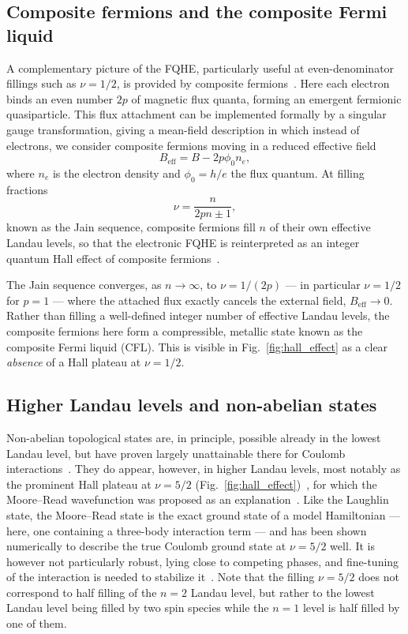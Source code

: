 \subsection{Composite fermions and the composite Fermi liquid}
A complementary picture of the FQHE, particularly useful at even-denominator fillings such as $\nu = 1/2$, is provided by composite fermions~\cite{jain1989composite}. Here each electron binds an even number $2p$ of magnetic flux quanta, forming an emergent fermionic quasiparticle. This flux attachment can be implemented formally by a singular gauge transformation, giving a mean-field description in which instead of electrons, we consider composite fermions moving in a reduced effective field
\begin{equation}
    B_{\mathrm{eff}} = B - 2p\phi_0 n_e,
\end{equation}
where $n_e$ is the electron density and $\phi_0 = h/e$ the flux quantum. At filling fractions
\begin{equation}
\nu = \frac{n}{2pn \pm 1},
\label{eq:jain_sequence}
\end{equation}
known as the Jain sequence, composite fermions fill $n$ of their own effective Landau levels, so that the electronic FQHE is reinterpreted as an integer quantum Hall effect of composite fermions~\cite{jain1989composite}.

The Jain sequence converges, as $n \to \infty$, to $\nu = 1/(2p)$ --- in particular $\nu=1/2$ for $p=1$ --- where the attached flux exactly cancels the external field, $B_{\mathrm{eff}} \to 0$. Rather than filling a well-defined integer number of effective Landau levels, the composite fermions here form a compressible, metallic state known as the composite Fermi liquid (CFL). This is visible in Fig.~\ref{fig:hall_effect} as a clear \textit{absence} of a Hall plateau at $\nu = 1/2$.

\subsection{Higher Landau levels and non-abelian states}
Non-abelian topological states are, in principle, possible already in the lowest Landau level, but have proven largely unattainable there for Coulomb interactions~\cite{storni2010fractional}. They do appear, however, in higher Landau levels, most notably as the prominent Hall plateau at $\nu = 5/2$ (Fig.~\ref{fig:hall_effect})~\cite{willett1987observation}, for which the Moore--Read wavefunction was proposed as an explanation~\cite{MOORE1991362}. Like the Laughlin state, the Moore--Read state is the exact ground state of a model Hamiltonian --- here, one containing a three-body interaction term --- and has been shown numerically to describe the true Coulomb ground state at $\nu = 5/2$ well. It is however not particularly robust, lying close to competing phases, and fine-tuning of the interaction is needed to stabilize it~\cite{rezayi2000incompressible}. Note that the filling $\nu = 5/2$ does not correspond to half filling of the $n=2$ Landau level, but rather to the lowest Landau level being filled by two spin species while the $n=1$ level is half filled by one of them. %

